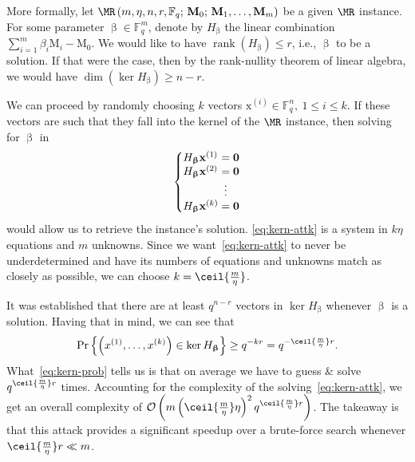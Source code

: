\documentclass{article}
\DeclareMathOperator{\rank}{rank}
\theoremstyle{remark}
\theoremstyle{definition}
\theoremstyle{plain}
\renewcommand*{\vec}[1]{\bm{\mathrm{#1}}}
\newcommand{\matr}[1]{\bm{\mathrm{#1}}}
\begin{document}
More formally, let
$\MR\left(m, \eta, n, r, \mathbb{F}_q;\, \matr{M}_0;\, \matr{M}_1, \ldots,
  \matr{M}_m\right)$ be a given $\MR$ instance.  For some parameter
$\vec{\upbeta} \in \mathbb{F}_q^m$, denote by $H_{\vec{\upbeta}}$ the linear
combination $\sum\nolimits_{i=1}^{m}\beta_i \matr{M}_i - \matr{M}_0$.  We would
like to have $\rank\left(H_{\vec{\upbeta}}\right) \le r$, i.e., $\vec{\upbeta}$
to be a solution.  If that were the case, then by the rank-nullity theorem of
linear algebra, we would have $\dim(\ker H_{\vec{\upbeta}}) \ge n - r$.

We can proceed by randomly choosing $k$ vectors
$\vec{x}^{(i)} \in \mathbb{F}_q^n,\ 1 \le i \le k$.  If these vectors are such
that they fall into the kernel of the $\MR$ instance, then solving for
$\vec{\upbeta}$ in
\begin{equation}\label{eq:kern-attk}
  \setlength{\arraycolsep}{0pt}
  \newcolumntype{B}{>{{}}c<{{}}}
  \left\{
    \begin{array}{l B l}
      H_{\vec{\upbeta}} \vec{x}^{(1)} & = & \vec{0} \\
      H_{\vec{\upbeta}} \vec{x}^{(2)} & = & \vec{0} \\
                                      & \vdots & \\
      H_{\vec{\upbeta}} \vec{x}^{(k)} & = & \vec{0}
    \end{array}
  \right.
\end{equation}
would allow us to retrieve the instance's solution.  \eqref{eq:kern-attk} is a
system in $k \eta$ equations and $m$ unknowns.  Since we
want~\eqref{eq:kern-attk} to never be underdetermined and have its numbers of
equations and unknowns match as closely as possible, we can choose
$k = \ceil{\frac m \eta}$.

It was established that there are at least $q^{n - r}$ vectors in
$\ker H_{\vec{\upbeta}}$ whenever $\vec{\upbeta}$ is a solution.  Having that in
mind, we can see that
\begin{equation}\label{eq:kern-prob}
  \Pr\left\{\left(x^{(1)},\ldots,x^{(k)}\right) \in \ker H_{\vec{\upbeta}}\right\}
  \ge q^{-k r} = q^{-\ceil{\frac m \eta} r}\text{.}
\end{equation}
What~\eqref{eq:kern-prob} tells us is that on average we have to guess \& solve
$q^{\ceil{\frac m \eta} r}$ times.  Accounting for the complexity of the
solving~\eqref{eq:kern-attk}, we get an overall complexity of
$\mathcal{O}\left(m \left(\ceil{\frac m \eta} \eta\right)^2 q^{\ceil{\frac m
      \eta} r}\right)$.  The takeaway is that this attack provides a significant
speedup over a brute-force search whenever $\ceil{\frac m \eta} r \ll m$.
\end{document}
